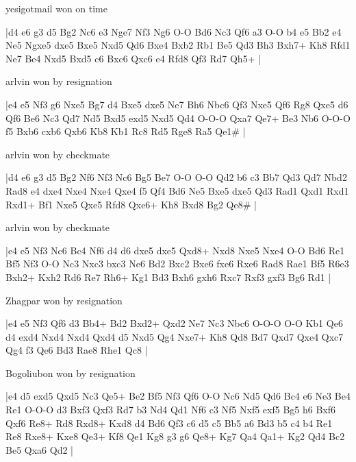 \showboard

yesigotmail won on time

\makegametitle
|d4 e6 g3 d5 Bg2 Nc6 e3 Nge7 Nf3 Ng6 O-O Bd6 Nc3 Qf6 a3 O-O b4 e5 Bb2 e4 Ne5 Ngxe5 dxe5 Bxe5 Nxd5 Qd6 Bxe4 Bxb2 Rb1 Be5 Qd3 Bh3 Bxh7+ Kh8 Rfd1 Ne7 Be4 Nxd5 Bxd5 c6 Bxc6 Qxc6 e4 Rfd8 Qf3 Rd7 Qh5+  |

\showboard

arlvin won by resignation

\makegametitle
|e4 e5 Nf3 g6 Nxe5 Bg7 d4 Bxe5 dxe5 Ne7 Bh6 Nbc6 Qf3 Nxe5 Qf6 Rg8 Qxe5 d6 Qf6 Be6 Nc3 Qd7 Nd5 Bxd5 exd5 Nxd5 Qd4 O-O-O Qxa7 Qe7+ Be3 Nb6 O-O-O f5 Bxb6 cxb6 Qxb6 Kb8 Kb1 Rc8 Rd5 Rge8 Ra5 Qe1\#  |

\showboard

arlvin won by checkmate

\makegametitle
|d4 e6 g3 d5 Bg2 Nf6 Nf3 Nc6 Bg5 Be7 O-O O-O Qd2 b6 c3 Bb7 Qd3 Qd7 Nbd2 Rad8 e4 dxe4 Nxe4 Nxe4 Qxe4 f5 Qf4 Bd6 Ne5 Bxe5 dxe5 Qd3 Rad1 Qxd1 Rxd1 Rxd1+ Bf1 Nxe5 Qxe5 Rfd8 Qxe6+ Kh8 Bxd8 Bg2 Qe8\#  |

\showboard

arlvin won by checkmate

\makegametitle
|e4 e5 Nf3 Nc6 Bc4 Nf6 d4 d6 dxe5 dxe5 Qxd8+ Nxd8 Nxe5 Nxe4 O-O Bd6 Re1 Bf5 Nf3 O-O Nc3 Nxc3 bxc3 Ne6 Bd2 Bxc2 Bxe6 fxe6 Rxe6 Rad8 Rae1 Bf5 R6e3 Bxh2+ Kxh2 Rd6 Re7 Rh6+ Kg1 Bd3 Bxh6 gxh6 Rxc7 Rxf3 gxf3 Bg6 Rd1  |

\showboard

Zhagpar won by resignation

\makegametitle
|e4 e5 Nf3 Qf6 d3 Bb4+ Bd2 Bxd2+ Qxd2 Ne7 Nc3 Nbc6 O-O-O O-O Kb1 Qe6 d4 exd4 Nxd4 Nxd4 Qxd4 d5 Nxd5 Qg4 Nxe7+ Kh8 Qd8 Bd7 Qxd7 Qxe4 Qxc7 Qg4 f3 Qe6 Bd3 Rae8 Rhe1 Qc8  |

\showboard

Bogoliubon won by resignation

\makegametitle
|e4 d5 exd5 Qxd5 Nc3 Qe5+ Be2 Bf5 Nf3 Qf6 O-O Nc6 Nd5 Qd6 Bc4 e6 Ne3 Be4 Re1 O-O-O d3 Bxf3 Qxf3 Rd7 b3 Nd4 Qd1 Nf6 c3 Nf5 Nxf5 exf5 Bg5 h6 Bxf6 Qxf6 Re8+ Rd8 Rxd8+ Kxd8 d4 Bd6 Qf3 c6 d5 c5 Bb5 a6 Bd3 b5 c4 b4 Re1 Re8 Rxe8+ Kxe8 Qe3+ Kf8 Qe1 Kg8 g3 g6 Qe8+ Kg7 Qa4 Qa1+ Kg2 Qd4 Bc2 Be5 Qxa6 Qd2  |

